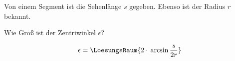 \begin{frage}[1]%
  Von einem Segment ist die Sehenlänge $s$ gegeben.
  Ebenso ist der Radius $r$ bekannt.

  Wie Groß ist der Zentriwinkel $\epsilon$?
  
  $$\epsilon = \LoesungsRaum{2\cdot{}\arcsin{\frac{s}{2r} }}$$
  
  \end{frage} 
